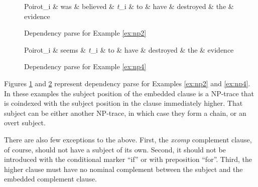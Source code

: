     \begin{figure}[!ht]
    	\centering
    	\begin{dependency}
    		\begin{deptext}[]
    			Poirot_i \& was \& believed \& \textit{t}_i \& to \& have \& destroyed \& the \& evidence \\
    		\end{deptext}
    	\end{dependency}
    	\caption{Dependency parse for Example \ref{ex:np2}}
    	\label{fig:np-mcg1}
    \end{figure}
    
    \begin{figure}[!ht]
        \centering
        \begin{dependency}
            \begin{deptext}[]
                Poirot_i \& seems \& \textit{t}_i \& to \& have \& destroyed \& the \& evidence \\
            \end{deptext}
        \end{dependency}
        \caption{Dependency parse for Example \ref{ex:np4}}
        \label{fig:np-mcg2} 
    \end{figure}

    Figures \ref{fig:np-mcg1} and \ref{fig:np-mcg2} represent dependency parse for Examples \ref{ex:np2} and \ref{ex:np4}. In these examples the subject position of the embedded clause is a NP-trace that is coindexed with the subject position in the  clause immediately higher. That subject can be either another NP-trace, in which case they form a chain, or an overt subject. 

    There are also few exceptions to the above. First, the \textit{xcomp} complement clause, of course, should not have a subject of its own. Second, it should not be introduced with the conditional marker ``if'' or with preposition ``for''. Third, the higher clause must have no nominal complement between the subject and the embedded complement clause. 

